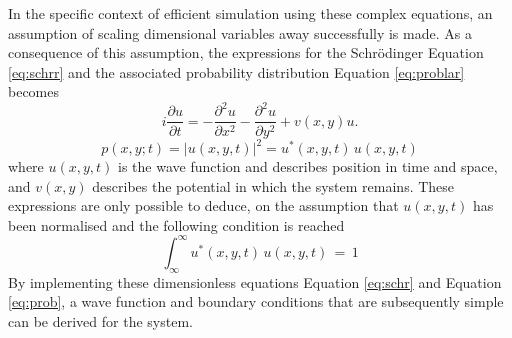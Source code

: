 \documentclass[10pt, nofootinbib, twocolumn]{revtex4-1}
\begin{document}
In the specific context of efficient simulation using these complex equations, an assumption of scaling dimensional variables away successfully is made. As a consequence of this assumption, the expressions for the Schrödinger Equation \eqref{eq:schrr} and the associated probability distribution Equation \eqref{eq:problar} becomes 
\begin{equation}\label{eq:schr}
    i \frac{\partial u}{\partial t} = -\frac{\partial^2 u}{\partial x^2} - \frac{\partial^2 u}{\partial y^2} + v(x,y) u.
\end{equation}
\begin{equation}\label{eq:prob}
    p(x,y;t) = |u(x,y,t)|^2 = u^*(x,y,t) \, u(x,y,t)
\end{equation}
where $u(x,y,t)$ is the wave function and describes position in time and space, and $v(x,y)$ describes the potential in which the system remains. These expressions are only possible to deduce, on the assumption that $u(x,y,t)$ has been normalised \cite{griffiths} and the following condition is reached
\begin{equation}\label{eq:norm}
    \int_{\infty}^{\infty}{u^*(x,y,t) \, u(x,y,t)} \, = \, 1
\end{equation}
By implementing these dimensionless equations Equation \eqref{eq:schr} and Equation \eqref{eq:prob}, a wave function and boundary conditions that are subsequently simple can be derived for the system. 
\end{document}
